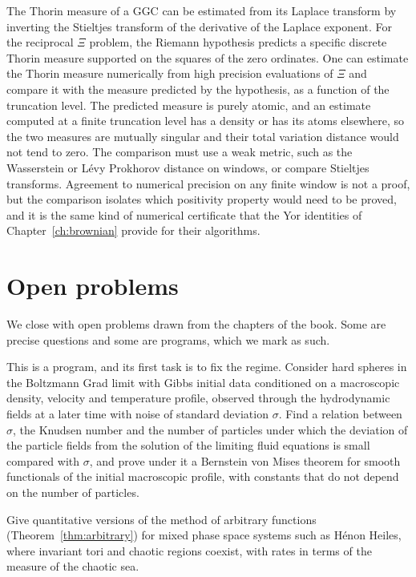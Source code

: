 The Thorin measure of a GGC can be estimated from its Laplace transform by inverting the Stieltjes transform of the derivative of the Laplace exponent. For the reciprocal $\Xi$ problem, the Riemann hypothesis predicts a specific discrete Thorin measure supported on the squares of the zero ordinates. One can estimate the Thorin measure numerically from high precision evaluations of $\Xi$ and compare it with the measure predicted by the hypothesis, as a function of the truncation level. The predicted measure is purely atomic, and an estimate computed at a finite truncation level has a density or has its atoms elsewhere, so the two measures are mutually singular and their total variation distance would not tend to zero. The comparison must use a weak metric, such as the Wasserstein or L\'evy Prokhorov distance on windows, or compare Stieltjes transforms. Agreement to numerical precision on any finite window is not a proof, but the comparison isolates which positivity property would need to be proved, and it is the same kind of numerical certificate that the Yor identities of Chapter~\ref{ch:brownian} provide for their algorithms.

\section{Open problems}

We close with open problems drawn from the chapters of the book. Some are precise questions and some are programs, which we mark as such.

\begin{problem}\label{prob:inferential_sixth}%
This is a program, and its first task is to fix the regime. Consider hard spheres in the Boltzmann Grad limit with Gibbs initial data conditioned on a macroscopic density, velocity and temperature profile, observed through the hydrodynamic fields at a later time with noise of standard deviation $\sigma$. Find a relation between $\sigma$, the Knudsen number and the number of particles under which the deviation of the particle fields from the solution of the limiting fluid equations is small compared with $\sigma$, and prove under it a Bernstein von Mises theorem for smooth functionals of the initial macroscopic profile, with constants that do not depend on the number of particles.
\end{problem}

\begin{problem}[Poincar\'e]\label{prob:poincare}%
Give quantitative versions of the method of arbitrary functions (Theorem~\ref{thm:arbitrary}) for mixed phase space systems such as H\'enon Heiles, where invariant tori and chaotic regions coexist, with rates in terms of the measure of the chaotic sea.
\end{problem}

